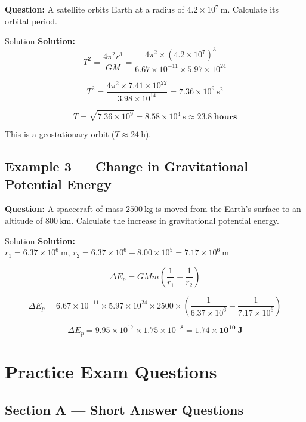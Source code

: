 \textbf{Question:} A satellite orbits Earth at a radius of $4.2\times10^7\ \text{m}$. Calculate its orbital period.

\begin{examplebox}{Solution}
\textbf{Solution:}\\
$$T^2 = \frac{4\pi^2 r^3}{GM} = \frac{4\pi^2 \times (4.2\times10^7)^3}{6.67\times10^{-11} \times 5.97\times10^{24}}$$

$$T^2 = \frac{4\pi^2 \times 7.41\times10^{22}}{3.98\times10^{14}} = 7.36\times10^9\ \text{s}^2$$

$$T = \sqrt{7.36\times10^9} = 8.58\times10^4\ \text{s} \approx \mathbf{23.8\ \text{hours}}$$

This is a geostationary orbit ($T \approx 24\ \text{h}$).
\end{examplebox}

\subsection*{Example 3 — Change in Gravitational Potential Energy}

\textbf{Question:} A spacecraft of mass $2500\ \text{kg}$ is moved from the Earth's surface to an altitude of $800\ \text{km}$. Calculate the increase in gravitational potential energy.

\begin{examplebox}{Solution}
\textbf{Solution:}\\
$r_1 = 6.37\times10^6\ \text{m}$, \quad $r_2 = 6.37\times10^6 + 8.00\times10^5 = 7.17\times10^6\ \text{m}$

$$\Delta E_p = GMm\left(\frac{1}{r_1} - \frac{1}{r_2}\right)$$

$$\Delta E_p = 6.67\times10^{-11} \times 5.97\times10^{24} \times 2500 \times \left(\frac{1}{6.37\times10^6} - \frac{1}{7.17\times10^6}\right)$$

$$\Delta E_p = 9.95\times10^{17} \times 1.75\times10^{-8} = \mathbf{1.74\times10^{10}\ \text{J}}$$
\end{examplebox}

\section{Practice Exam Questions}

\subsection*{Section A — Short Answer Questions}

